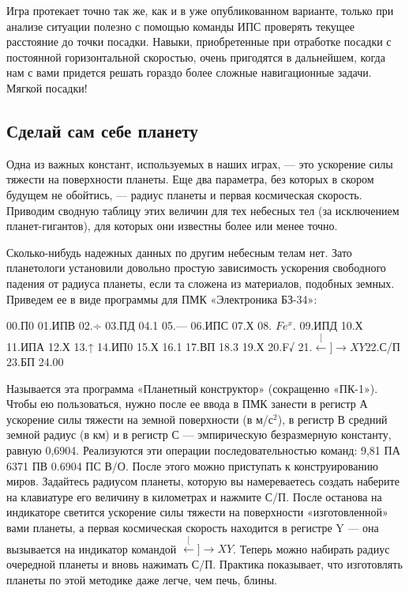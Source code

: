 \documentclass[11pt,a4paper,oneside]{article}
\def\XY{$\stackrel[\leftarrow]{\rightarrow}{XY}$}
\begin{document}
Игра протекает точно так же, как и в уже опубликованном варианте, только при анализе ситуации полезно с помощью команды ИПС проверять текущее расстояние до точки посадки. Навыки, приобретенные при отработке посадки с постоянной горизонтальной скоростью, очень пригодятся в дальнейшем, когда нам с вами придется решать гораздо более сложные навигационные задачи. Мягкой посадки!

\subsection{Сделай сам себе планету}

Одна из важных констант, используемых в наших играх, — это ускорение силы тяжести на поверхности планеты. Еще два параметра, без которых в скором будущем не обойтись, — радиус планеты и первая космическая скорость. Приводим сводную таблицу этих величин для тех небесных тел (за исключением планет-гигантов), для которых они известны более или менее точно.

Сколько-нибудь надежных данных по другим небесным телам нет. Зато планетологи установили довольно простую зависимость ускорения свободного падения от радиуса планеты, если та сложена из материалов, подобных земных. Приведем ее в виде программы для ПМК «Электроника БЗ-34»:

00.П0 01.ИПВ 02.÷ 03.ПД 04.1 05.— 06.ИПС 07.Х 08. $Fe^{x}$. 09.ИПД 10.Х
11.ИПА 12.Х 13.↑ 14.ИП0 15.Х 16.1 17.ВП 18.3 19.Х 20.F√ 21.\XY 22.С/П 23.БП 24.00

Называется эта программа «Планетный конструктор» (сокращенно «ПК-1»). Чтобы ею пользоваться, нужно после ее ввода в ПМК занести в регистр А ускорение силы тяжести на земной поверхности (в м/с$^{2}$), в регистр В средний земной радиус (в км) и в регистр С — эмпирическую безразмерную константу, равную 0,6904. Реализуются эти операции	последовательностью команд: 9,81 ПА 6371 ПВ 0.6904 ПС В/О. После этого можно приступать к конструированию миров. Задайтесь радиусом планеты, которую вы намереваетесь создать наберите на клавиатуре его величину в километрах и нажмите С/П. После останова на индикаторе светится ускорение силы тяжести на поверхности «изготовленной» вами планеты, а первая космическая скорость находится в регистре Y — она вызывается на индикатор командой \XY. Теперь можно набирать радиус очередной планеты и вновь нажимать С/П. Практика показывает, что изготовлять планеты по этой методике даже легче, чем печь, блины.
\end{document}
